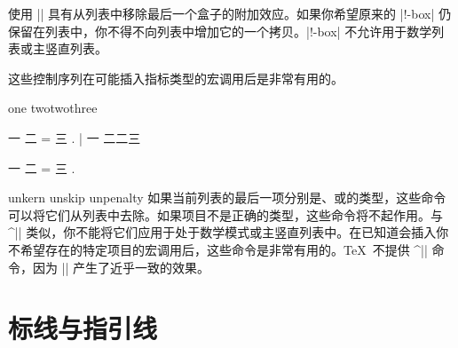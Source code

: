 使用 |\lastbox| 具有从列表中移除最后一个盒子的附加效应。如果你希望原来的 |\last!-box| 仍保留在列表中，你不得不向列表中增加它的一个拷贝。|\last!-box| 不允许用于数学列表或主竖直列表。

这些控制序列在可能插入指标类型的宏调用后是非常有用的。

\example
\def\a{two\kern 15pt}
one \a\a{}\lastkern three\par
\def\a{\hbox{二}}
一 \a
{} = \lastbox %
三 .
|
\produces
\def\a{二\kern 15pt}
一 \a\a{}\lastkern 三\par
\def\a{\hbox{二}}
一 \a
{} = \lastbox %
三 .
\endexample
\enddesc

\begindesc
\cts unkern {}
\cts unskip {}
\cts unpenalty {}
\explain
如果当前列表的最后一项分别是、或的类型，这些命令可以将它们从列表中去除。如果项目不是正确的类型，这些命令将不起作用。与 ^|\lastbox| 类似，你不能将它们应用于处于数学模式或主竖直列表中。在已知道会插入你不希望存在的特定项目的宏调用后，这些命令是非常有用的。\TeX\ 不提供 ^|\unbox| 命令，因为 |\lastbox| 产生了近乎一致的效果。
\enddesc


\section {标线与指引线}

